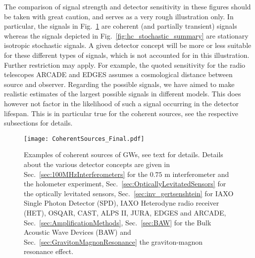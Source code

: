 \documentclass[11pt,a4paper]{article}
\begin{document}
The comparison of signal strength and detector sensitivity in these figures should be taken with great caution, and serves as a very rough illustration only. In particular, the signals in Fig.~\ref{fig:hc_coherent_summary} are coherent (and partially transient) signals whereas the signals depicted in Fig.~\ref{fig:hc_stochastic_summary}  are stationary isotropic stochastic signals. A given detector concept will be more or less suitable for these different types of signals, which is not accounted for in this illustration. Further restriction may apply. For example, the quoted sensitivity for the radio telescopes ARCADE and EDGES assumes a cosmological distance between source and observer.
%
Regarding the possible signals, we have aimed to make realistic estimates of the largest possible signals in different models. This does however not factor in the likelihood of such a signal occurring in the detector lifespan. This is in particular true for the coherent sources, see the respective subsections for details.\\

\begin{figure}[h!]
    \centering
    \texttt{[image: CoherentSources\_Final.pdf]}
    \caption{Examples of coherent sources of GWs, see text for details. {Details about the various detector concepts are given in Sec.~\ref{sec:100MHzInterferometers} for the $0.75$ m interferometer and the holometer experiment, Sec.~\ref{sec:OpticallyLevitatedSensors} for the optically levitated sensors, Sec.~\ref{sec:inv_gertsenshtein} for IAXO Single Photon Detector (SPD), IAXO Heterodyne radio receiver (HET), OSQAR, CAST, ALPS II, JURA, EDGES and ARCADE, Sec.~\ref{sec:AmplificationMethods}, Sec.~\ref{sec:BAW} for the Bulk Acoustic Wave Devices (BAW) and Sec.~\ref{sec:GravitonMagnonResonance} the graviton-magnon resonance effect.}}
    \label{fig:hc_coherent_summary}
\end{figure}
\end{document}

